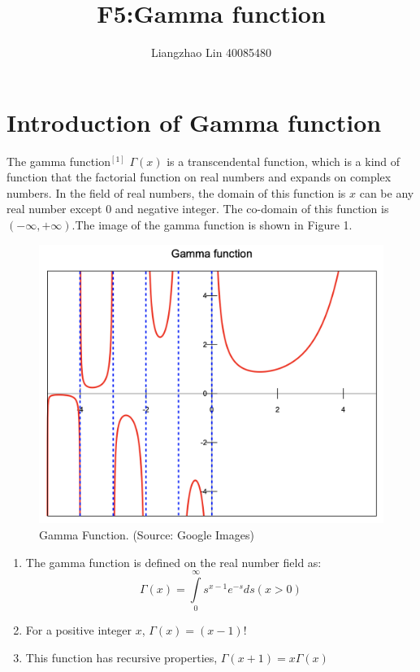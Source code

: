 \documentclass[12pt]{extarticle}
\title{F5:Gamma function}
\date{}
\author{Liangzhao Lin 40085480}
\newcommand{\<}{\langle}
\renewcommand{\>}{\rangle}
\theoremstyle{definition}
\begin{document}
\maketitle
\section{Introduction of Gamma function }
\setlength{\parindent}{2em}
The gamma function$^{[1]}$ $\Gamma \left( x \right)$ is a transcendental function, which is a kind of function that the factorial function on real numbers and expands on complex numbers.
\newline
\indent
In the field of real numbers, the domain of this function is $x$ can be any real number except 0 and negative integer. The co-domain of this function is $(-{\infty},+{\infty}).$The image of the gamma function is shown in Figure 1.
\begin{figure}[ht]

\centering
\includegraphics[scale=0.3]{gammafunction.png}
\caption{Gamma Function.  (Source: Google Images)}
\label{fig:label}
\end{figure}
\begin{enumerate}[(1)]

\item The gamma function is defined on the real number field as:$$\Gamma \left( x \right) = \int\limits_0^\infty {s^{x - 1} e^{ - s} ds}(x>0)$$
\item For a positive integer $x$, $\Gamma \left( x \right) = (x-1)!$
\item This function has recursive properties,  $\Gamma \left( x+1 \right) = x\Gamma\left( x \right) $
\end{enumerate}
\end{document}
